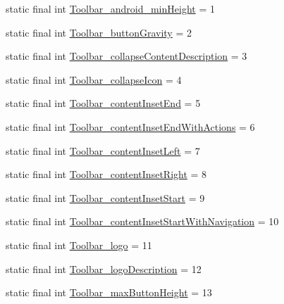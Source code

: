 \begin{DoxyCompactItemize}
\item 
static final int \mbox{\hyperlink{classandroid_1_1support_1_1design_1_1R_1_1styleable_a577363bd15a566f94f5c7a9f24cf1ab5}{Toolbar\+\_\+android\+\_\+min\+Height}} = 1
\item 
static final int \mbox{\hyperlink{classandroid_1_1support_1_1design_1_1R_1_1styleable_ab8977566ee7aef9bbce4cfa04b80db1e}{Toolbar\+\_\+button\+Gravity}} = 2
\item 
static final int \mbox{\hyperlink{classandroid_1_1support_1_1design_1_1R_1_1styleable_a2ad949787d7fa8e09c179eaa0ebb74aa}{Toolbar\+\_\+collapse\+Content\+Description}} = 3
\item 
static final int \mbox{\hyperlink{classandroid_1_1support_1_1design_1_1R_1_1styleable_a89d8fbe1d316576ebe59e92d248279a6}{Toolbar\+\_\+collapse\+Icon}} = 4
\item 
static final int \mbox{\hyperlink{classandroid_1_1support_1_1design_1_1R_1_1styleable_a1a5e3de0eef2c8b8ce35918ff513531a}{Toolbar\+\_\+content\+Inset\+End}} = 5
\item 
static final int \mbox{\hyperlink{classandroid_1_1support_1_1design_1_1R_1_1styleable_ad675ba82ebfaa483e6d0eba17711deb9}{Toolbar\+\_\+content\+Inset\+End\+With\+Actions}} = 6
\item 
static final int \mbox{\hyperlink{classandroid_1_1support_1_1design_1_1R_1_1styleable_a0742be136466ef1d6a26776e0be4c829}{Toolbar\+\_\+content\+Inset\+Left}} = 7
\item 
static final int \mbox{\hyperlink{classandroid_1_1support_1_1design_1_1R_1_1styleable_ad73822dda4f37103fc7bf98a9bc738e3}{Toolbar\+\_\+content\+Inset\+Right}} = 8
\item 
static final int \mbox{\hyperlink{classandroid_1_1support_1_1design_1_1R_1_1styleable_a68d6350d263a0ef9072b1b981d832ef7}{Toolbar\+\_\+content\+Inset\+Start}} = 9
\item 
static final int \mbox{\hyperlink{classandroid_1_1support_1_1design_1_1R_1_1styleable_ae15be1a44663b68b2ff8f2c1e0352e9d}{Toolbar\+\_\+content\+Inset\+Start\+With\+Navigation}} = 10
\item 
static final int \mbox{\hyperlink{classandroid_1_1support_1_1design_1_1R_1_1styleable_ab0a9b926dbb509c5df3bea32aaa96cd8}{Toolbar\+\_\+logo}} = 11
\item 
static final int \mbox{\hyperlink{classandroid_1_1support_1_1design_1_1R_1_1styleable_a9e268b93eb8ebe84bb34a177df14a6bb}{Toolbar\+\_\+logo\+Description}} = 12
\item 
static final int \mbox{\hyperlink{classandroid_1_1support_1_1design_1_1R_1_1styleable_a573da6093a404400731d342841b50168}{Toolbar\+\_\+max\+Button\+Height}} = 13

\end{DoxyCompactItemize}
